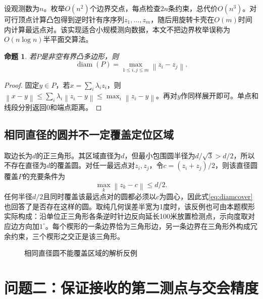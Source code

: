 \documentclass[UTF8,a4paper,zihao=-4,fontset=windows]{ctexart}
\newtheorem{proposition}[theorem]{命题}
\newcommand{\norm}[1]{\left\lVert#1\right\rVert}
\begin{document}
设观测数为$n$。枚举$O(n^2)$个边界交点，每点检查$2n$条约束，总代价$O(n^3)$。对可行顶点计算凸包得到逆时针有序序列$z_1,\ldots,z_m$，随后用旋转卡壳在$O(m)$时间内计算最远点对。该实现适合小规模测向数据，本文不把边界枚举误称为$O(n\log n)$半平面交算法。

\begin{proposition}
若$P$是非空有界凸多边形，则
\begin{equation}\operatorname{diam}(P)=\max_{1\le i,j\le m}\norm{z_i-z_j}.\end{equation}
\end{proposition}
\begin{proof}
固定$y\in P$，若$x=\sum_i\lambda_i z_i$，则$\norm{x-y}\le\sum_i\lambda_i\norm{z_i-y}\le\max_i\norm{z_i-y}$。再对$y$作同样展开即可。单点和线段分别返回0和端点距离。
\end{proof}

\subsection{相同直径的圆并不一定覆盖定位区域}
取边长为$d$的正三角形。其区域直径为$d$，但最小包围圆半径为$d/\sqrt3>d/2$，所以不存在直径为$d$的覆盖圆。对任一最远点对$z_i,z_j$，令$c=(z_i+z_j)/2$，则该直径圆覆盖$P$的充要条件为
\begin{equation}\label{eq:diamcover}
\max_k\norm{z_k-c}\le d/2.
\end{equation}
任何半径$d/2$且同时覆盖该最远点对的圆都必须以$c$为圆心，因此式\eqref{eq:diamcover}也回答了是否存在这样的圆。取纯几何误差半宽为1度时，该反例也可由本题楔形实际构成：沿单位正三角形各条逆时针边反向延长100米放置检测点，示向度取对应边方向加$1^\circ$。每个楔形的一条边界恰为三角形边，另一条边界在三角形外构成冗余约束，三个楔形之交正是该三角形。

\begin{figure}[htbp]\centering
{}
\caption{相同直径圆不能覆盖区域的解析反例}
\end{figure}

\section{问题二：保证接收的第二测点与交会精度}
\end{document}
